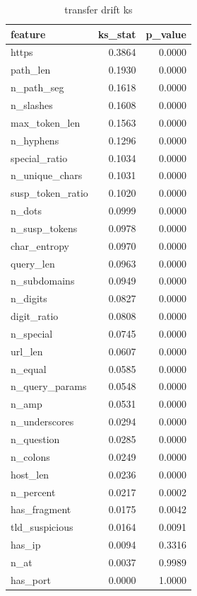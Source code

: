 \begin{table}[htbp]
\caption{transfer drift ks}
\label{tab:transfer_drift_ks}
\begin{tabular}{lrr}
\toprule
feature & ks_stat & p_value \\
\midrule
https & 0.3864 & 0.0000 \\
path\_len & 0.1930 & 0.0000 \\
n\_path\_seg & 0.1618 & 0.0000 \\
n\_slashes & 0.1608 & 0.0000 \\
max\_token\_len & 0.1563 & 0.0000 \\
n\_hyphens & 0.1296 & 0.0000 \\
special\_ratio & 0.1034 & 0.0000 \\
n\_unique\_chars & 0.1031 & 0.0000 \\
susp\_token\_ratio & 0.1020 & 0.0000 \\
n\_dots & 0.0999 & 0.0000 \\
n\_susp\_tokens & 0.0978 & 0.0000 \\
char\_entropy & 0.0970 & 0.0000 \\
query\_len & 0.0963 & 0.0000 \\
n\_subdomains & 0.0949 & 0.0000 \\
n\_digits & 0.0827 & 0.0000 \\
digit\_ratio & 0.0808 & 0.0000 \\
n\_special & 0.0745 & 0.0000 \\
url\_len & 0.0607 & 0.0000 \\
n\_equal & 0.0585 & 0.0000 \\
n\_query\_params & 0.0548 & 0.0000 \\
n\_amp & 0.0531 & 0.0000 \\
n\_underscores & 0.0294 & 0.0000 \\
n\_question & 0.0285 & 0.0000 \\
n\_colons & 0.0249 & 0.0000 \\
host\_len & 0.0236 & 0.0000 \\
n\_percent & 0.0217 & 0.0002 \\
has\_fragment & 0.0175 & 0.0042 \\
tld\_suspicious & 0.0164 & 0.0091 \\
has\_ip & 0.0094 & 0.3316 \\
n\_at & 0.0037 & 0.9989 \\
has\_port & 0.0000 & 1.0000 \\
\bottomrule
\end{tabular}
\end{table}

